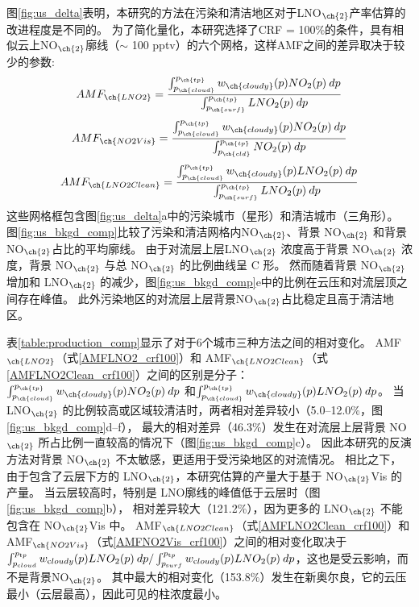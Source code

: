 图\ref{fig:us_delta}表明，本研究的方法在污染和清洁地区对于LNO$_{\ch{2}}$产率估算的改进程度是不同的。
为了简化量化，本研究选择了CRF = 100\%的条件，具有相似云上NO$_{\ch{2}}$廓线（$\sim$ 100 pptv）的六个网格，这样AMF之间的差异取决于较少的参数:
\begin{equation} \label{AMFLNO2_crf100}
AMF_{\ch{LNO2}} = \frac{\int_{p_{\ch{cloud}}}^{p_{\ch{tp}}} w_{\ch{cloudy}}(p) NO_2(p) \: dp}{\int_{p_{\ch{surf}}}^{p_{\ch{tp}}} LNO_2(p) \: dp}
\end{equation}
\begin{equation} \label{AMFNO2Vis_crf100}
AMF_{\ch{NO2Vis}} = \frac{\int_{p_{\ch{cloud}}}^{p_{\ch{tp}}} w_{\ch{cloudy}}(p) NO_2(p) \: dp}{\int_{p_{\ch{cld}}}^{p_{\ch{tp}}} NO_2(p) \: dp}
\end{equation}
\begin{equation} \label{AMFLNO2Clean_crf100}
AMF_{\ch{LNO2Clean}} = \frac{\int_{p_{\ch{cloud}}}^{p_{\ch{tp}}} w_{\ch{cloudy}}(p) LNO_2(p) \: dp}{\int_{p_{\ch{surf}}}^{p_{\ch{tp}}} LNO_2(p) \: dp}
\end{equation}
这些网格框包含图\ref{fig:us_delta}a中的污染城市（星形）和清洁城市（三角形）。
图\ref{fig:us_bkgd_comp}比较了污染和清洁网格内NO$_{\ch{2}}$、背景 NO$_{\ch{2}}$ 和背景 NO$_{\ch{2}}$占比的平均廓线。
由于对流层上层LNO$_{\ch{2}}$ 浓度高于背景 NO$_{\ch{2}}$ 浓度，背景 NO$_{\ch{2}}$ 与总 NO$_{\ch{2}}$ 的比例曲线呈 C 形。
然而随着背景 NO$_{\ch{2}}$ 增加和 LNO$_{\ch{2}}$ 的减少，图\ref{fig:us_bkgd_comp}e中的比例在云压和对流层顶之间存在峰值。
此外污染地区的对流层上层背景NO$_{\ch{2}}$占比稳定且高于清洁地区。

表\ref{table:production_comp}显示了对于6个城市三种方法之间的相对变化。
AMF$_{\ch{LNO2}}$（式\ref{AMFLNO2_crf100}）和 AMF$_{\ch{LNO2Clean}}$（式\ref{AMFLNO2Clean_crf100}）之间的区别是分子：
$\int_{p_{\ch{cloud}}}^{p_{\ch{tp}}} w_{\ch{cloudy}}(p) NO_2(p) \: dp$
和$\int_{p_{\ch{cloud}}}^{p_{\ch{tp}}} w_{\ch{cloudy}}(p) LNO_2(p) \: dp$。
当 LNO$_{\ch{2}}$ 的比例较高或区域较清洁时，两者相对差异较小（5.0--12.0\%，图\ref{fig:us_bkgd_comp}d--f），
最大的相对差异（46.3\%）发生在对流层上层背景 NO$_{\ch{2}}$ 所占比例一直较高的情况下（图\ref{fig:us_bkgd_comp}c）。
因此本研究的反演方法对背景 NO$_{\ch{2}}$ 不太敏感，更适用于受污染地区的对流情况。
相比之下，由于包含了云层下方的 LNO$_{\ch{2}}$，本研究估算的产量大于基于 NO$_{\ch{2}}$Vis 的产量。
当云层较高时，特别是 LNO廓线的峰值低于云层时（图\ref{fig:us_bkgd_comp}b），
相对差异较大（121.2\%），因为更多的 LNO$_{\ch{2}}$ 不能包含在 NO$_{\ch{2}}$Vis 中。
AMF$_{\ch{LNO2Clean}}$（式\ref{AMFLNO2Clean_crf100}）和 AMF$_{\ch{NO2Vis}}$（式\ref{AMFNO2Vis_crf100}）之间的相对变化取决于
$\int_{p_{\textrm cloud}}^{p_{\textrm tp}} w_{\textrm cloudy}(p) LNO_2(p) \: dp / \int_{p_{\textrm surf}}^{p_{\textrm tp}} w_{\textrm cloudy}(p) LNO_2(p) \: dp$，这也是受云影响，而不是背景NO$_{\ch{2}}$。
其中最大的相对变化（153.8\%）发生在新奥尔良，它的云压最小（云层最高），因此可见的柱浓度最小。



